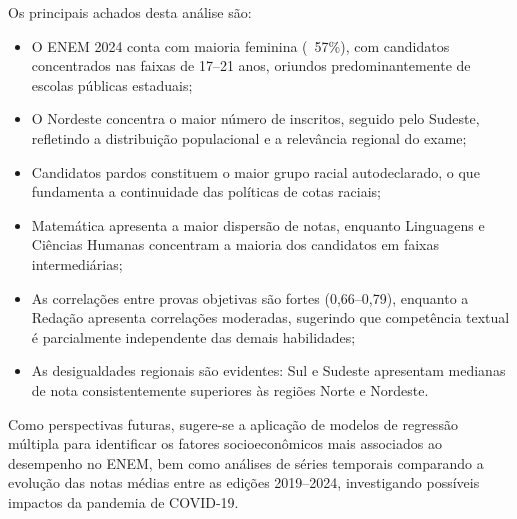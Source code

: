 \documentclass[
    12pt,
    oneside,
    a4paper,
    chapter=TITLE,
    section=TITLE
]{abntex2}
\begin{document}
Os principais achados desta análise são:

\begin{itemize}
    \item O ENEM 2024 conta com maioria feminina (~57\%), com candidatos concentrados nas
    faixas de 17--21 anos, oriundos predominantemente de escolas públicas estaduais;

    \item O Nordeste concentra o maior número de inscritos, seguido pelo Sudeste,
    refletindo a distribuição populacional e a relevância regional do exame;

    \item Candidatos pardos constituem o maior grupo racial autodeclarado, o que
    fundamenta a continuidade das políticas de cotas raciais;

    \item Matemática apresenta a maior dispersão de notas, enquanto Linguagens e
    Ciências Humanas concentram a maioria dos candidatos em faixas intermediárias;

    \item As correlações entre provas objetivas são fortes (0,66--0,79), enquanto
    a Redação apresenta correlações moderadas, sugerindo que competência textual
    é parcialmente independente das demais habilidades;

    \item As desigualdades regionais são evidentes: Sul e Sudeste apresentam
    medianas de nota consistentemente superiores às regiões Norte e Nordeste.
\end{itemize}

Como perspectivas futuras, sugere-se a aplicação de modelos de regressão múltipla para
identificar os fatores socioeconômicos mais associados ao desempenho no ENEM, bem como
análises de séries temporais comparando a evolução das notas médias entre as edições
2019--2024, investigando possíveis impactos da pandemia de COVID-19.

\postextual

\end{document}
